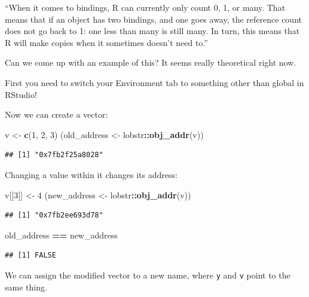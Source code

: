 \documentclass[]{book}
\newenvironment{Shaded}{\begin{snugshade}}{\end{snugshade}}
\newcommand{\DecValTok}[1]{\textcolor[rgb]{0.00,0.00,0.81}{#1}}
\newcommand{\KeywordTok}[1]{\textcolor[rgb]{0.13,0.29,0.53}{\textbf{#1}}}
\newcommand{\NormalTok}[1]{#1}
\newcommand{\OperatorTok}[1]{\textcolor[rgb]{0.81,0.36,0.00}{\textbf{#1}}}
\newcommand{\StringTok}[1]{\textcolor[rgb]{0.31,0.60,0.02}{#1}}
\begin{document}
``When it comes to bindings, R can currently only count 0, 1, or many. That means that if an object has two bindings, and one goes away, the reference count does not go back to 1: one less than many is still many. In turn, this means that R will make copies when it sometimes doesn't need to.''

Can we come up with an example of this? It seems really theoretical right now.

First you need to switch your Environment tab to something other than global in RStudio!

Now we can create a vector:

\begin{Shaded}
\begin{Highlighting}[]
\NormalTok{v <-}\StringTok{ }\KeywordTok{c}\NormalTok{(}\DecValTok{1}\NormalTok{, }\DecValTok{2}\NormalTok{, }\DecValTok{3}\NormalTok{)}
\NormalTok{(old_address <-}\StringTok{ }\NormalTok{lobstr}\OperatorTok{::}\KeywordTok{obj_addr}\NormalTok{(v))}
\end{Highlighting}
\end{Shaded}

\begin{verbatim}
## [1] "0x7fb2f25a8028"
\end{verbatim}

Changing a value within it changes its address:

\begin{Shaded}
\begin{Highlighting}[]
\NormalTok{v[[}\DecValTok{3}\NormalTok{]] <-}\StringTok{ }\DecValTok{4}
\NormalTok{(new_address <-}\StringTok{ }\NormalTok{lobstr}\OperatorTok{::}\KeywordTok{obj_addr}\NormalTok{(v))}
\end{Highlighting}
\end{Shaded}

\begin{verbatim}
## [1] "0x7fb2ee693d78"
\end{verbatim}

\begin{Shaded}
\begin{Highlighting}[]
\NormalTok{old_address }\OperatorTok{==}\StringTok{ }\NormalTok{new_address}
\end{Highlighting}
\end{Shaded}

\begin{verbatim}
## [1] FALSE
\end{verbatim}

We can assign the modified vector to a new name, where \texttt{y} and \texttt{v} point to the same thing.
\end{document}
